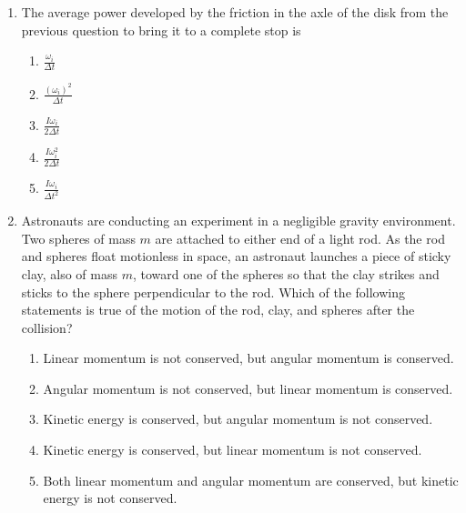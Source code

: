 \documentclass{../../../oss-apphys}
\begin{document}
\begin{multicols*}{2}
\begin{enumerate}[leftmargin=18pt]
  \item The average power developed by the friction in the axle of the disk
    from the previous question to bring it to a complete stop is
    \begin{enumerate}[itemsep=4pt,topsep=0pt,leftmargin=18pt,label=(\Alph*)]
    \item $\displaystyle\frac{\omega_i}{\Delta t}$
    \item $\displaystyle\frac{(\omega_i)^2}{\Delta t}$
    \item $\displaystyle\frac{I\omega_i}{2\Delta t}$
    \item $\displaystyle\frac{I\omega_i^2}{2\Delta t}$
    \item $\displaystyle\frac{I\omega_i}{\Delta t^2}$
    \end{enumerate}    
    \columnbreak
    
  \item Astronauts are conducting an experiment in a negligible gravity
    environment. Two spheres of mass $m$ are attached to either end of a light
    rod. As the rod and spheres float motionless in space, an astronaut
    launches a piece of sticky clay, also of mass $m$, toward one of the spheres
    so that the clay strikes and sticks to the sphere perpendicular to the rod.
    Which of the following statements is true of the motion of the rod, clay,
    and spheres after the collision?
    \begin{center}
    \end{center}
    \begin{enumerate}[nosep,leftmargin=18pt,label=(\Alph*)]
    \item Linear momentum is not conserved, but angular momentum is conserved.
    \item Angular momentum is not conserved, but linear momentum is conserved.
    \item Kinetic energy is conserved, but angular momentum is not conserved.
    \item Kinetic energy is conserved, but linear momentum is not conserved.
    \item Both linear momentum and angular momentum are conserved, but kinetic
      energy is not conserved.
    \end{enumerate}
    

\end{enumerate}
\end{multicols*}
\end{document}

